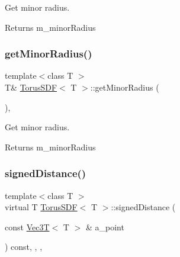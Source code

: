 Get minor radius. 

\begin{DoxyReturn}{Returns}
m\+\_\+minor\+Radius 
\end{DoxyReturn}
\mbox{\label{classTorusSDF_a0eff8ed5c429c6f80580c9660ac9cdfa}} 
\subsubsection{\texorpdfstring{get\+Minor\+Radius()}{getMinorRadius()}\hspace{0.1cm}{\footnotesize\ttfamily [2/2]}}
{\footnotesize\ttfamily template$<$class T $>$ \\
T\& \hyperlink{classTorusSDF}{Torus\+S\+DF}$<$ T $>$\+::get\+Minor\+Radius (\begin{DoxyParamCaption}{ }\end{DoxyParamCaption})\hspace{0.3cm}{\ttfamily [inline]}, {\ttfamily [noexcept]}}



Get minor radius. 

\begin{DoxyReturn}{Returns}
m\+\_\+minor\+Radius 
\end{DoxyReturn}
\mbox{\label{classTorusSDF_a23b4d455de2b7b9988ce81833ccd5302}} 
\subsubsection{\texorpdfstring{signed\+Distance()}{signedDistance()}}
{\footnotesize\ttfamily template$<$class T $>$ \\
virtual T \hyperlink{classTorusSDF}{Torus\+S\+DF}$<$ T $>$\+::signed\+Distance (\begin{DoxyParamCaption}\item[{const \hyperlink{classVec3T}{Vec3T}$<$ T $>$ \&}]{a\+\_\+point }\end{DoxyParamCaption}) const\hspace{0.3cm}{\ttfamily [inline]}, {\ttfamily [override]}, {\ttfamily [virtual]}, {\ttfamily [noexcept]}}



